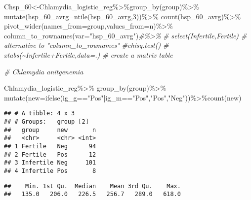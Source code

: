 \documentclass[
]{article}
\newenvironment{Shaded}{\begin{snugshade}}{\end{snugshade}}
\newcommand{\AttributeTok}[1]{\textcolor[rgb]{0.77,0.63,0.00}{#1}}
\newcommand{\CommentTok}[1]{\textcolor[rgb]{0.56,0.35,0.01}{\textit{#1}}}
\newcommand{\DecValTok}[1]{\textcolor[rgb]{0.00,0.00,0.81}{#1}}
\newcommand{\FunctionTok}[1]{\textcolor[rgb]{0.00,0.00,0.00}{#1}}
\newcommand{\NormalTok}[1]{#1}
\newcommand{\OtherTok}[1]{\textcolor[rgb]{0.56,0.35,0.01}{#1}}
\newcommand{\SpecialCharTok}[1]{\textcolor[rgb]{0.00,0.00,0.00}{#1}}
\newcommand{\StringTok}[1]{\textcolor[rgb]{0.31,0.60,0.02}{#1}}
\begin{document}
\begin{Shaded}
\begin{Highlighting}[]
\NormalTok{Chsp\_60}\OtherTok{\textless{}{-}}\NormalTok{Chlamydia\_logistic\_reg}\SpecialCharTok{\%\textgreater{}\%}\FunctionTok{group\_by}\NormalTok{(group)}\SpecialCharTok{\%\textgreater{}\%}
  \FunctionTok{mutate}\NormalTok{(}\AttributeTok{hsp\_60\_avrg=}\FunctionTok{ntile}\NormalTok{(hsp\_60\_avrg,}\DecValTok{3}\NormalTok{))}\SpecialCharTok{\%\textgreater{}\%}
  \FunctionTok{count}\NormalTok{(hsp\_60\_avrg)}\SpecialCharTok{\%\textgreater{}\%}
  \FunctionTok{pivot\_wider}\NormalTok{(}\AttributeTok{names\_from=}\NormalTok{group,}\AttributeTok{values\_from=}\NormalTok{n)}\SpecialCharTok{\%\textgreater{}\%}
  \FunctionTok{column\_to\_rownames}\NormalTok{(}\AttributeTok{var=}\StringTok{"hsp\_60\_avrg"}\NormalTok{)}\CommentTok{\#\%\textgreater{}\%}
  \CommentTok{\# select(Infertile,Fertile) \# alternative to "column\_to\_rownames"}
  \CommentTok{\#chisq.test()}
\CommentTok{\# xtabs(\textasciitilde{}Infertile+Fertile,data=.) \# create a matrix table}

\CommentTok{\# Chlamydia anitgenemia}

\NormalTok{Chlamydia\_logistic\_reg}\SpecialCharTok{\%\textgreater{}\%}
  \FunctionTok{group\_by}\NormalTok{(group)}\SpecialCharTok{\%\textgreater{}\%}
  \FunctionTok{mutate}\NormalTok{(}\AttributeTok{new=}\FunctionTok{ifelse}\NormalTok{(ig\_g}\SpecialCharTok{==}\StringTok{"Pos"}\SpecialCharTok{|}\NormalTok{ig\_m}\SpecialCharTok{==}\StringTok{"Pos"}\NormalTok{,}\StringTok{"Pos"}\NormalTok{,}\StringTok{"Neg"}\NormalTok{))}\SpecialCharTok{\%\textgreater{}\%}\FunctionTok{count}\NormalTok{(new)}
\end{Highlighting}
\end{Shaded}

\begin{verbatim}
## # A tibble: 4 x 3
## # Groups:   group [2]
##   group     new       n
##   <chr>     <chr> <int>
## 1 Fertile   Neg      94
## 2 Fertile   Pos      12
## 3 Infertile Neg     101
## 4 Infertile Pos       8
\end{verbatim}

\begin{Shaded}
\end{Shaded}

\begin{verbatim}
##    Min. 1st Qu.  Median    Mean 3rd Qu.    Max. 
##   135.0   206.0   226.5   256.7   289.0   618.0
\end{verbatim}
\end{document}
